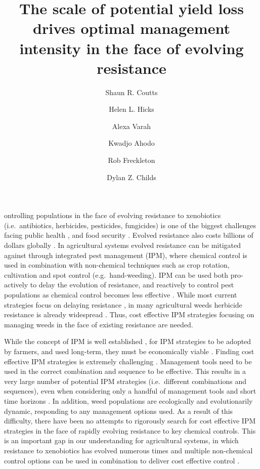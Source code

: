 \documentclass[9pt,twocolumn,twoside,lineno]{pnas-new}
\title{The scale of potential yield loss drives optimal management intensity in the face of evolving resistance}
\author[a,1]{Shaun R. Coutts}
\author[a]{Helen L. Hicks}
\author[b]{Alexa Varah}
\author[a]{Kwadjo Ahodo}
\author[a]{Rob Freckleton}
\author[a]{Dylan Z. Childs}
\affil[a]{Animal and Plant Sciences, University of Sheffield, Sheffield S10 2TN, UK}
\affil[b]{Zoological Society of London, London NW1 4RY, UK}
\begin{document}
\verticaladjustment{-2pt}

\maketitle
\thispagestyle{firststyle}

ontrolling populations in the face of evolving resistance to xenobiotics (i.e.\ antibiotics, herbicides, pesticides, fungicides) is one of the biggest challenges facing public health \citep{Laxm2016, Willy2017}, and food security \citep{Denh1992, Palu2001, Hick2018}. Evolved resistance also costs billions of dollars globally \citep{Livi2016, Ches2018, Hick2018}. In agricultural systems evolved resistance can be mitigated against through integrated pest management (IPM), where chemical control is used in combination with non-chemical techniques such as crop rotation, cultivation and spot control (e.g.\ hand-weeding). IPM can be used both pro-actively to delay the evolution of resistance, and reactively to control pest populations as chemical control becomes less effective \citep{Denh1992, Hick2018}. While most current strategies focus on delaying resistance \citep{REX2013}, in many agricultural weeds herbicide resistance is already widespread \citep{Jord1997, Samm2014, Hick2018}. Thus, cost effective IPM strategies focusing on managing weeds in the face of existing resistance are needed.               

While the concept of IPM is well established \citep{Bott1979}, for IPM strategies to be adopted by farmers, and used long-term, they must be economically viable \citep{Hurl2016}. Finding cost effective IPM strategies is extremely challenging \citep{Dana2014, Chal2015}. Management tools need to be used in the correct combination and sequence to be effective. This results in a very large number of potential IPM strategies (i.e.\ different combinations and sequences), even when considering only a handful of management tools and short time horizons \citep{Chal2015}. In addition, weed populations are ecologically and evolutionarily dynamic, responding to any management options used. As a result of this difficulty, there have been no attempts to rigorously search for cost effective IPM strategies in the face of rapidly evolving resistance to key chemical controls. This is an important gap in our understanding for agricultural systems, in which resistance to xenobiotics has evolved numerous times \citep{Denh1992, Palu2001, Samm2014} and multiple non-chemical control options can be used in combination to deliver cost effective control \citep{Lutm2013}.      
\end{document}
